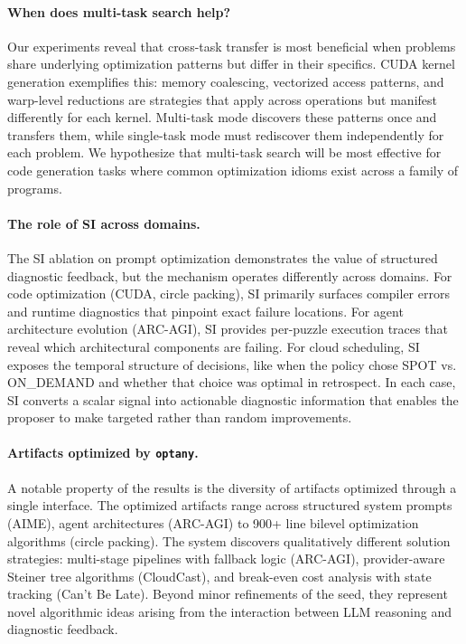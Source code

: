 \documentclass[sigconf,anonymous,review]{acmart}
\newcommand{\oa}{\texttt{optany}}
\newcommand{\asi}{SI}
\begin{document}
\paragraph{When does multi-task search help?}
Our experiments reveal that cross-task transfer is most beneficial when problems share underlying optimization patterns but differ in their specifics. CUDA kernel generation exemplifies this: memory coalescing, vectorized access patterns, and warp-level reductions are strategies that apply across operations but manifest differently for each kernel. Multi-task mode discovers these patterns once and transfers them, while single-task mode must rediscover them independently for each problem. We hypothesize that multi-task search will be most effective for code generation tasks where common optimization idioms exist across a family of programs.

\paragraph{The role of \asi{} across domains.}
The \asi{} ablation on prompt optimization demonstrates the value of structured diagnostic feedback, but the mechanism operates differently across domains. For code optimization (CUDA, circle packing), \asi{} primarily surfaces compiler errors and runtime diagnostics that pinpoint exact failure locations. For agent architecture evolution (ARC-AGI), \asi{} provides per-puzzle execution traces that reveal which architectural components are failing. For cloud scheduling, \asi{} exposes the temporal structure of decisions, like when the policy chose SPOT vs. ON\_DEMAND and whether that choice was optimal in retrospect. In each case, \asi{} converts a scalar signal into actionable diagnostic information that enables the proposer to make targeted rather than random improvements.

\paragraph{Artifacts optimized by \oa{}.}
A notable property of the results is the diversity of artifacts optimized through a single interface. The optimized artifacts range across structured system prompts (AIME), agent architectures (ARC-AGI) to 900+ line bilevel optimization algorithms (circle packing). The system discovers qualitatively different solution strategies: multi-stage pipelines with fallback logic (ARC-AGI), provider-aware Steiner tree algorithms (CloudCast), and break-even cost analysis with state tracking (Can't Be Late). Beyond minor refinements of the seed, they represent novel algorithmic ideas arising from the interaction between LLM reasoning and diagnostic feedback.
\end{document}
